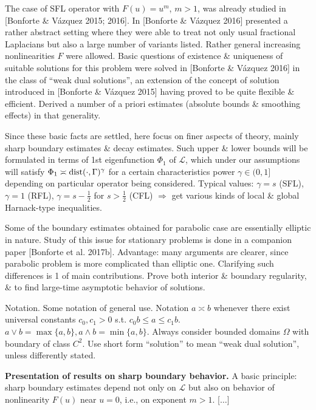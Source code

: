 \documentclass{article}
\begin{document}
\begin{enumerate}
\begin{itemize}
		The case of SFL operator with $F(u) = u^m$, $m > 1$, was already studied in [Bonforte \& Vázquez 2015; 2016]. In [Bonforte \& Vázquez 2016] presented a rather abstract setting where they were able to treat not only usual fractional Laplacians but also a large number of variants listed. Rather general increasing nonlinearities $F$ were allowed. Basic questions of existence \& uniqueness of suitable solutions for this problem were solved in [Bonforte \& Vázquez 2016] in the class of ``weak dual solutions'', an extension of the concept of solution introduced in [Bonforte \& Vázquez 2015] having proved to be quite flexible \& efficient. Derived a number of a priori estimates (absolute bounds \& smoothing effects) in that generality.
		
		Since these basic facts are settled, here focus on finer aspects of theory, mainly sharp boundary estimates \& decay estimates. Such upper \& lower bounds will be formulated in terms of 1st eigenfunction $\Phi_1$ of $\mathcal{L}$, which under our assumptions will satisfy $\Phi_1\asymp{\rm dist}(\cdot,\Gamma)^\gamma$ for a certain characteristics power $\gamma\in(0,1]$ depending on particular operator being considered. Typical values: $\gamma = s$ (SFL), $\gamma = 1$ (RFL), $\gamma = s - \frac{1}{2}$ for $s > \frac{1}{2}$ (CFL) $\Rightarrow$ get various kinds of local \& global Harnack-type inequalities.
		
		Some of the boundary estimates obtained for parabolic case are essentially elliptic in nature. Study of this issue for stationary problems is done in a companion paper [Bonforte et al. 2017b]. Advantage: many arguments are clearer, since parabolic problem is more complicated than elliptic one. Clarifying such differences is 1 of main contributions. Prove both interior \& boundary regularity, \& to find large-time asymptotic behavior of solutions.
		
		{\sf Notation.} Some notation of general use. Notation $a\asymp b$ whenever there exist universal constants $c_0,c_1 > 0$ s.t. $c_0b\le a\le c_1b$. $a\lor b = \max\{a,b\},a\land b = \min\{a,b\}$. Always consider bounded domains $\Omega$ with boundary of class $C^2$. Use short form ``solution'' to mean ``weak dual solution'', unless differently stated.
		
		{\bf Presentation of results on sharp boundary behavior.} A basic principle: sharp boundary estimates depend not only on $\mathcal{L}$ but also on behavior of nonlinearity $F(u)$ near $u = 0$, i.e., on exponent $m > 1$. [$\ldots$]
		

\end{itemize}
\end{enumerate}
\end{document}
